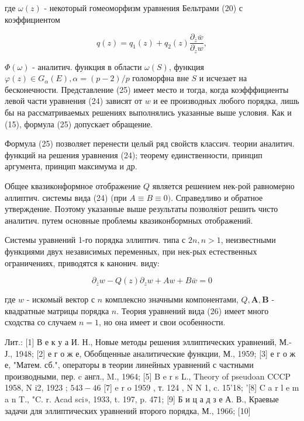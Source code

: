 \documentclass[10pt]{article}
\begin{document}
где $\omega(z)$ - некоторый гомеоморфизм уравнения Бельтрами (20) с коэффициентом



\[

q(z)=q_{1}(z)+q_{2}(z) \frac{\partial_{\bar{z}} \bar{w}}{\partial_{z} w},

\]



$\Phi(\omega)$ - аналитич. функция в области $\omega(S)$, функция $\varphi(z) \in G_{\alpha}(E), \alpha=(p-2) / p$ голоморфна вне $S$ и исчезает на бесконечности. Представление (25) имеет место и тогда, когда коэфффициенты левой части уравнения (24) зависят от $w$ и ее производных любого порядка, лишь бы на рассматриваемых решениях выполнялись указанные выше условия. Как и (15), формула (25) допускает обращение.



Формула (25) позволяет перенести целый ряд свойств классич. теории аналитич. функций на решения уравнения (24); теорему единственности, принцип аргумента, принцип максимума и др.



Общее квазиконформное отображение $Q$ является решением нек-рой равномерно әллиптич. системы вида (24) (при $A \equiv B \equiv 0)$. Справедливо и обратное утверждение. Поэтому указанные выше результаты позволяіот решить чисто аналитич. путем основные проблемы квазиконбормных отображений.



Системы уравнений 1-го порядка эллиптич. типа с $2 n, n>1$, неизвестными функциями двух независимых переменных, при нек-рых естественных ограничениях, приводятся к канонич. виду:



\[

\partial_{\bar{z}} w-Q(z) \partial_{z} w+A w+B \bar{w}=0

\]



где $w$ - искомый вектор с $n$ комплексно значными компонентами, $Q, \boldsymbol{A}, \boldsymbol{B}$ - квадратные матрицы порядка $n$. Теория уравнений вида (26) имеет много сходства со случаем $n=1$, но она имеет и свои особенности.



Лит.: [1] В е к у а И. Н., Новые методы решения эллиптических уравнений, М.- Ј., 1948; [2] е г о ж е, Обобщенные аналитические функции, М., 1959; [3] е г о ж е, "Матем. сб.", операторы в теории линейных уравнений с частными производными, пер. c англ., M., 1964; [5] B e r s L., Theory of pseudoan CCCP 1958, N i2, 1923 ; $543-46$ [7] e r o 1959 , т. 124 , N N 1, c. 15'18; '[8] C a r l e m a n T., "C. r. Acad sci», 1933, t. 197, p. 471; [9] Б и ц а д з е А. В., Краевые задачи для эллиптических уравнений второго порядка, М., 1966; [10]
\end{document}
